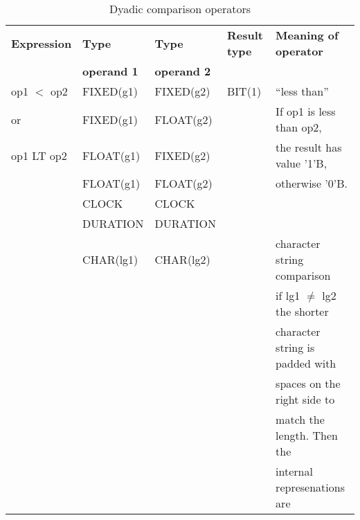 \begin{table} %
\begin{center}
\caption{Dyadic comparison operators}
\label{tab_dyadic_compare}
\vspace{5mm}
\begin{tabular}{|l|l|l|l|l|}
\hline
{\bf Expression} & {\bf Type}      & {\bf Type}      & {\bf Result type} & {\bf Meaning of operator}\\
                 & {\bf operand 1} & {\bf operand 2} &                   & \\ \hline

op1 $<$ op2      & FIXED(g1)       & FIXED(g2)       &   BIT(1)             & ``less than''\\
or               & FIXED(g1)       & FLOAT(g2)       &                      & If op1 is less than op2,\\
op1 LT op2
\index{LT@\textbf{LT}|textbf}
       & FLOAT(g1)       & FIXED(g2)       &                      & the result has value '1'B,\\
                 & FLOAT(g1)       & FLOAT(g2)       &                      & otherwise '0'B.\\
                 & CLOCK           & CLOCK           &                      & \\
                 & DURATION        & DURATION        &                      & \\ \cline{2-3} \cline{5-5}
                 & CHAR(lg1)       & CHAR(lg2)       &                      & character string comparison\\
                 &                 &                 &                      & if lg1 $\neq$ lg2 the shorter  \\ 
                 &                 &                 &                      & character string is padded with\\
                 &                 &                 &                      & spaces on the right side to    \\
                 &                 &                 &                      & match the length. Then the    \\
                 &                 &                 &                      & internal represenations are \\ 

\end{tabular}
\end{center}
\end{table}
